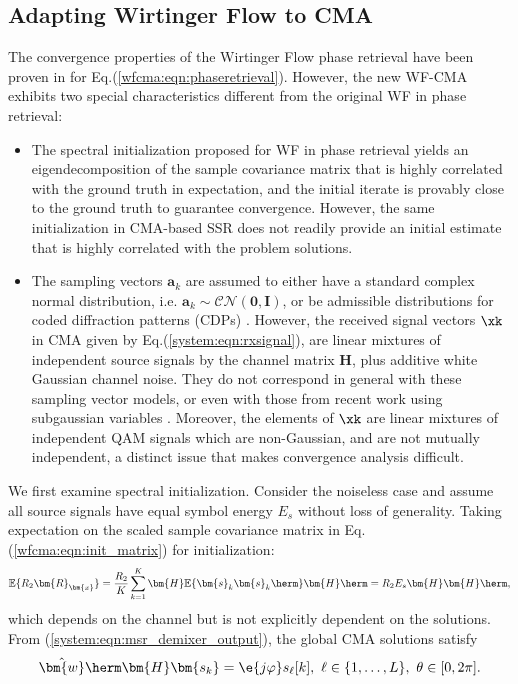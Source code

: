 \subsection{Adapting Wirtinger Flow to CMA}
The convergence properties of the Wirtinger Flow phase retrieval have been proven in \cite{Candes2015a_phaseretrievalWF} for Eq.(\ref{wfcma:eqn:phaseretrieval}). However, 
the new WF-CMA exhibits two special characteristics different from the original WF
in phase retrieval:
\begin{itemize}
\item The spectral initialization proposed for WF in phase retrieval \cite{Candes2015a_phaseretrievalWF} yields an eigendecomposition of the sample covariance  matrix that is highly correlated with the ground truth in expectation, and the initial iterate is provably close to the ground truth to guarantee convergence. However, the same initialization in CMA-based SSR does not readily provide an initial estimate that is highly correlated with the problem solutions.

\item The sampling vectors $\bm{a}_k$ are assumed to either have a standard complex normal distribution, i.e. $\bm{a}_k\sim\mathcal{CN}(\bm{0},\bm{I})$, or be admissible distributions for coded diffraction patterns (CDPs) \cite{Candes2015a_phaseretrievalWF}. 
However, the received signal vectors $\xk$ in CMA given by Eq.(\ref{system:eqn:rxsignal}), are linear mixtures of independent source signals by the channel matrix $\bm{H}$, plus additive white Gaussian channel noise.
They do not correspond in general with these sampling vector models, or even with those from recent work using subgaussian variables \cite{Gao2019subgaussianwf}.
Moreover, the elements of $\xk$ are linear mixtures of independent QAM signals which are non-Gaussian, and are not mutually independent, a distinct issue that makes convergence analysis difficult.
\end{itemize}

We first examine spectral initialization. Consider the noiseless case and assume all source signals have equal symbol energy $E_s$ without loss of generality.
Taking expectation on the scaled sample covariance matrix in Eq.(\ref{wfcma:eqn:init_matrix}) for initialization:
\begin{equation}
\mathbb{E}\{R_2\bm{R}_{\bm{x}}\}=\frac{R_2}{K}\sum_{k=1}^K\bm{H}\mathbb{E}\{\bm{s}_k\bm{s}_k\herm\}\bm{H}\herm=R_2 E_s\bm{H}\bm{H}\herm,
\end{equation}
which depends on the channel but is not explicitly dependent on the solutions. From (\ref{system:eqn:msr_demixer_output}), the global CMA solutions satisfy
\begin{equation}
\hat{\bm{w}}\herm\bm{H}\bm{s_k}=
\e{j\varphi}s_{\ell}[k],\,\,\ell\in\{1,\ldots,L\},\,\, \theta\in[0,2\pi]. \label{wfcma:eqn:global_cma_sols}
\end{equation}

